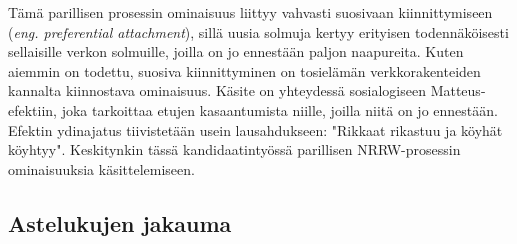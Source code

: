 \documentclass[finnish, 12pt, a4paper, sci, utf8, pdfa]{aaltothesis}
\begin{document}
Tämä parillisen prosessin ominaisuus liittyy vahvasti suosivaan kiinnittymiseen (\textit{eng. preferential attachment}), sillä uusia solmuja kertyy erityisen todennäköisesti sellaisille verkon solmuille, joilla on jo ennestään paljon naapureita. Kuten aiemmin on todettu, suosiva kiinnittyminen on tosielämän verkkorakenteiden kannalta kiinnostava ominaisuus. Käsite on yhteydessä sosialogiseen Matteus-efektiin, joka tarkoittaa etujen kasaantumista niille, joilla niitä on jo ennestään. Efektin ydinajatus tiivistetään usein lausahdukseen: "Rikkaat rikastuu ja köyhät köyhtyy". Keskitynkin tässä kandidaatintyössä parillisen NRRW-prosessin ominaisuuksia käsittelemiseen.

\subsection{Astelukujen jakauma}
\end{document}
